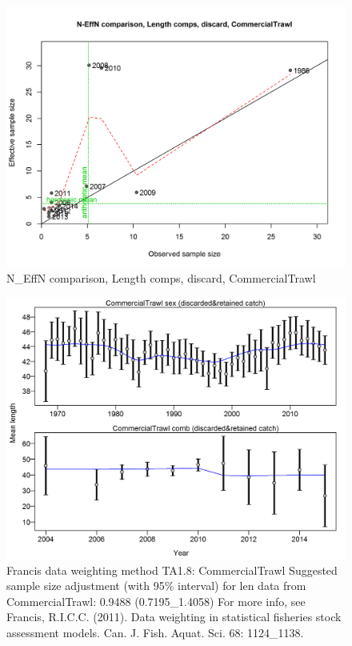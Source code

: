 \documentclass[12pt,]{article}
\begin{document}
\begin{figure}[htbp]
\centering
\includegraphics{./r4ss/plots_mod1/comp_lenfit_sampsize_flt1mkt1.png}
\caption{N\_EffN comparison, Length comps, discard, CommercialTrawl
\label{fig:mod1_8_comp_lenfit_sampsize_flt1mkt1}}
\end{figure}

\begin{figure}[htbp]
\centering
\includegraphics{./r4ss/plots_mod1/comp_lenfit_data_weighting_TA1.8_CommercialTrawl.png}
\caption{Francis data weighting method TA1.8: CommercialTrawl Suggested
sample size adjustment (with 95\% interval) for len data from
CommercialTrawl: 0.9488 (0.7195\_1.4058) For more info, see Francis,
R.I.C.C. (2011). Data weighting in statistical fisheries stock
assessment models. Can. J. Fish. Aquat. Sci. 68: 1124\_1138.
\label{fig:mod1_9_comp_lenfit_data_weighting_TA1.8_CommercialTrawl}}
\end{figure}
\end{document}
